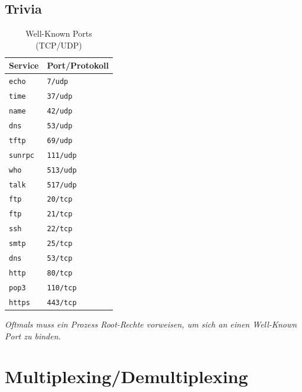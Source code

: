 \documentclass[a4paper, 11pt, accentcolor = tud3b]{tudreport}
\begin{document}
            \subsection{Trivia}
	            \begin{table}[H]
	            	\centering
	            	\begin{tabular}{l | l}
	            		Service         & Port/Protokoll   \\ \hline
	            		\texttt{echo}   & \texttt{7/udp}   \\
	            		\texttt{time}   & \texttt{37/udp}  \\
	            		\texttt{name}   & \texttt{42/udp}  \\
	            		\texttt{dns}    & \texttt{53/udp}  \\
	            		\texttt{tftp}   & \texttt{69/udp}  \\
	            		\texttt{sunrpc} & \texttt{111/udp} \\
	            		\texttt{who}    & \texttt{513/udp} \\
	            		\texttt{talk}   & \texttt{517/udp} \\ \hline
	            		\texttt{ftp}    & \texttt{20/tcp}  \\
	            		\texttt{ftp}    & \texttt{21/tcp}  \\
	            		\texttt{ssh}    & \texttt{22/tcp}  \\
	            		\texttt{smtp}   & \texttt{25/tcp}  \\
	            		\texttt{dns}    & \texttt{53/tcp}  \\
	            		\texttt{http}   & \texttt{80/tcp}  \\
	            		\texttt{pop3}   & \texttt{110/tcp} \\
	            		\texttt{https}  & \texttt{443/tcp}
	            	\end{tabular}
	            	\caption{Well-Known Ports (TCP/UDP)}
	            \end{table}
	            
	            \textit{Oftmals muss ein Prozess Root-Rechte vorweisen, um sich an einen Well-Known Port zu binden.}

        \section{Multiplexing/Demultiplexing}
	        \label{sec:de_multiplexing}
        
\end{document}
